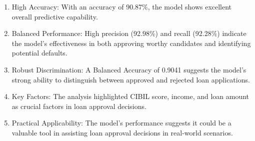 \documentclass[
]{article}
\begin{document}
\begin{enumerate}
\def\labelenumi{\arabic{enumi}.}
\item
  High Accuracy: With an accuracy of 90.87\%, the model shows excellent
  overall predictive capability.
\item
  Balanced Performance: High precision (92.98\%) and recall (92.28\%)
  indicate the model's effectiveness in both approving worthy candidates
  and identifying potential defaults.
\item
  Robust Discrimination: A Balanced Accuracy of 0.9041 suggests the
  model's strong ability to distinguish between approved and rejected
  loan applications.
\item
  Key Factors: The analysis highlighted CIBIL score, income, and loan
  amount as crucial factors in loan approval decisions.
\item
  Practical Applicability: The model's performance suggests it could be
  a valuable tool in assisting loan approval decisions in real-world
  scenarios.
\end{enumerate}
\end{document}

